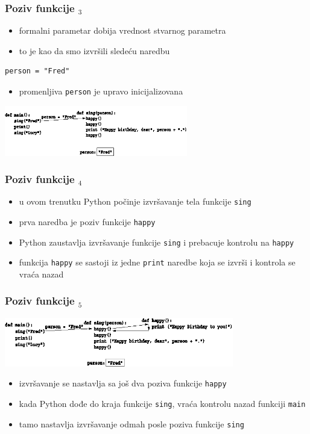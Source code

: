 \documentclass[compress]{beamer}
\begin{document}
\begin{frame}[fragile]
  \frametitle{Poziv funkcije $_3$}
  \begin{itemize}
    \item formalni parametar dobija vrednost stvarnog parametra
    \item to je kao da smo izvršili sledeću naredbu
  \end{itemize}
\begin{verbatim}
person = "Fred"
\end{verbatim}
  \begin{itemize}
    \item promenljiva \texttt{person} je upravo inicijalizovana
  \end{itemize}
  \begin{center}
    \includegraphics[width=8cm]{pic04}
  \end{center}
\end{frame}

\begin{frame}[fragile]
  \frametitle{Poziv funkcije $_4$}
  \begin{itemize}
    \item u ovom trenutku Python počinje izvršavanje tela funkcije \texttt{sing}
    \item prva naredba je poziv funkcije \texttt{happy}
    \item Python zaustavlja izvršavanje funkcije \texttt{sing} i prebacuje kontrolu na \texttt{happy}
    \item funkcija \texttt{happy} se sastoji iz jedne \texttt{print} naredbe koja se izvrši i kontrola se vraća nazad
  \end{itemize}
\end{frame}

\begin{frame}[fragile]
  \frametitle{Poziv funkcije $_5$}
  \begin{center}
    \includegraphics[width=10cm]{pic05}
  \end{center}
  \begin{itemize}
    \item izvršavanje se nastavlja sa još dva poziva funkcije \texttt{happy}
    \item kada Python dođe do kraja funkcije \texttt{sing}, vraća kontrolu nazad funkciji \texttt{main}
    \item tamo nastavlja izvršavanje odmah posle poziva funkcije \texttt{sing}
  \end{itemize}
\end{frame}
\end{document}
